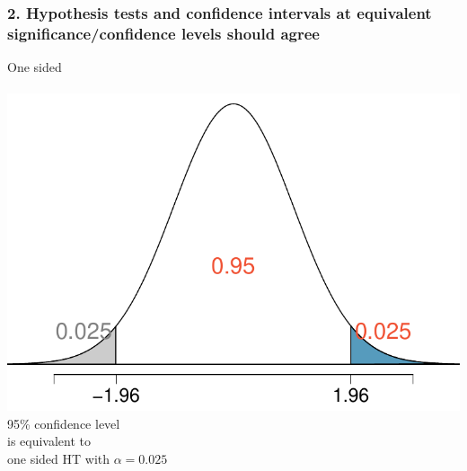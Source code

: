 \documentclass[slidestop,compress,mathserif,12pt,t,professionalfonts,xcolor=table]{beamer}
\begin{document}
\begin{frame}
\frametitle{2. Hypothesis tests and confidence intervals at equivalent significance/confidence levels should agree}

{\pause
\begin{center}
One sided\\
~\\
\includegraphics[width=\textwidth]{figures/sig_conf_equiv/CL95_onesided} \\
95\% confidence level \\
is equivalent to \\
one sided HT with $\alpha = 0.025$
\end{center}
}

\end{frame}
\end{document}
